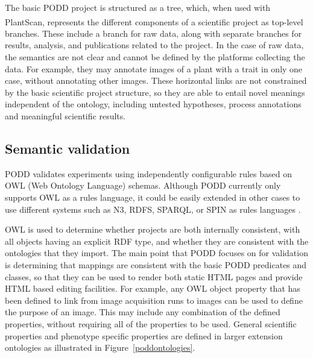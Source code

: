 \documentclass{llncs}
\begin{document}
The basic PODD project is structured as a tree, which, when used with
PlantScan\textsuperscript{\texttrademark}, represents the different components
of a scientific project as
top-level branches. These include a branch for raw data, along with separate
branches for results, analysis, and publications related to the project. In the
case of raw data, the semantics are not clear and cannot be defined by the
platforms collecting the data. 
For example, they may annotate images of a plant with a trait in only one case,
without annotating other images. These horizontal links are not constrained by
the basic scientific project structure, so they are able to entail novel
meanings independent of the ontology, including untested hypotheses, process
annotations and meaningful scientific results.


\subsection{Semantic validation}
PODD validates experiments using independently configurable rules based on OWL
(Web Ontology Language) schemas. Although PODD currently only supports OWL as a
rules language, it could be easily extended in other cases to use different
systems such as N3, RDFS, SPARQL, or SPIN as rules languages \cite{Fuerber2010}. 


OWL is used to determine whether projects are both internally consistent, with
all objects having an explicit RDF type, and whether they are consistent with
the ontologies that they import. The main point that PODD focuses on for
validation is determining that mappings are consistent with the basic PODD
predicates and classes, so that they can be used to render both static HTML
pages and provide HTML based editing facilities. For example, any OWL object
property that has been defined to link from image acquisition runs to images can
be used to define the purpose of an image. This may include any combination of
the defined properties, without requiring all of the properties to be used.
General scientific properties and phenotype specific properties are defined
in larger extension ontologies as illustrated in Figure~\ref{poddontologies}.
\end{document}
